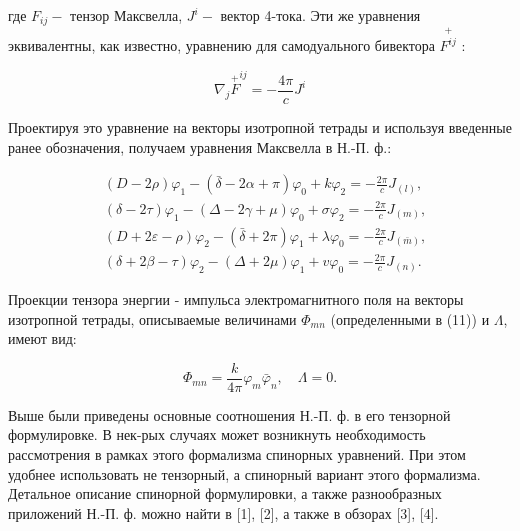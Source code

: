 \documentclass[10pt]{article}
\begin{document}
где $F_{i j}-$ тензор Максвелла, $J^{i}-$ вектор 4-тока. Эти же уравнения эквивалентны, как известно, уравнению для самодуального бивектора $\stackrel{+}{F^{i j}}$ :



\[

\nabla_{j} \stackrel{+}{F}^{i j}=-\frac{4 \pi}{c} J^{i}

\]



Проектируя это уравнение на векторы изотропной тетрады и используя введенные ранее обозначения, получаем уравнения Максвелла в Н.-П. ф.:



\[

\begin{aligned}

& (D-2 \rho) \varphi_{1}-(\bar{\delta}-2 \alpha+\pi) \varphi_{0}+k \varphi_{2}=-\frac{2 \pi}{c} J_{(l)}, \\

& (\delta-2 \tau) \varphi_{1}-(\Delta-2 \gamma+\mu) \varphi_{0}+\sigma \varphi_{2}=-\frac{2 \pi}{c} J_{(m)}, \\

& (D+2 \varepsilon-\rho) \varphi_{2}-(\bar{\delta}+2 \pi) \varphi_{1}+\lambda \varphi_{0}=-\frac{2 \pi}{c} J_{(\bar{m})}, \\

& (\delta+2 \beta-\tau) \varphi_{2}-(\Delta+2 \mu) \varphi_{1}+v \varphi_{0}=-\frac{2 \pi}{c} J_{(n)} .

\end{aligned}

\]



Проекции тензора энергии - импульса электромагнитного поля на векторы изотропной тетрады, описываемые величинами $\Phi_{m n}$ (определенными в (11)) и $\Lambda$, имеют вид:



\[

\Phi_{m n}=\frac{k}{4 \pi} \varphi_{m} \bar{\varphi}_{n}, \quad \Lambda=0 .

\]



Выше были приведены основные соотношения Н.-П. ф. в его тензорной формулировке. В нек-рых случаях может возникнуть необходимость рассмотрения в рамках этого формализма спинорных уравнений. При этом удобнее использовать не тензорный, а спинорный вариант этого формализма. Детальное описание спинорной формулировки, а также разнообразных приложений Н.-П. ф. можно найти в [1], [2], а также в обзорах [3], [4].
\end{document}
